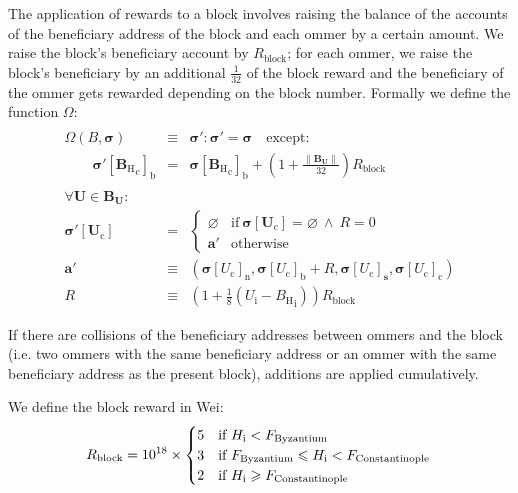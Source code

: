 \documentclass[9pt,oneside]{amsart}
\makeatletter
\newcommand{\linkdest}[1]{\Hy@raisedlink{\hypertarget{#1}{}}}
\makeatother
\begin{document}
\begin{multicols}{2}
The application of rewards to a block involves raising the balance of the accounts of the beneficiary address of the block and each ommer by a certain amount. We raise the block's beneficiary account by \hyperlink{R__block}{$R_{\mathrm{block}}$}; for each ommer, we raise the block's beneficiary by an additional $\frac{1}{32}$ of the block reward and the beneficiary of the ommer gets rewarded depending on the block number.\hypertarget{Omega}{} Formally we define the function $\Omega$:
\begin{eqnarray}
\\ \nonumber
\Omega(B, \boldsymbol{\sigma}) & \equiv & \boldsymbol{\sigma}': \boldsymbol{\sigma}' = \boldsymbol{\sigma} \quad \text{except:} \\
\qquad\boldsymbol{\sigma}'[{\mathbf{B}_{\mathrm{H}}}_{\mathrm{c}}]_{\mathrm{b}} & = & \boldsymbol{\sigma}[{\mathbf{B}_{\mathrm{H}}}_{\mathrm{c}}]_{\mathrm{b}} + \left(1 + \frac{\lVert \mathbf{B}_{\mathbf{U}}\rVert}{32}\right)R_{\mathrm{block}} \\
\\ \nonumber
\forall \mathbf{U} \in \mathbf{B}_{\mathbf{U}}: \\ \nonumber
\boldsymbol{\sigma}'[\mathbf{U}_{\mathrm{c}}] & = & \begin{cases}
\varnothing &\text{if}\ \boldsymbol{\sigma}[\mathbf{U}_{\mathrm{c}}] = \varnothing\ \wedge\ R = 0 \\
\mathbf{a}' &\text{otherwise}
\end{cases} \\
\mathbf{a}' &\equiv& (\boldsymbol{\sigma}[U_{\mathrm{c}}]_{\mathrm{n}}, \boldsymbol{\sigma}[U_{\mathrm{c}}]_{\mathrm{b}} + R, \boldsymbol{\sigma}[U_{\mathrm{c}}]_{\mathbf{s}}, \boldsymbol{\sigma}[U_{\mathrm{c}}]_{\mathrm{c}}) \\
R & \equiv & \left(1 + \frac{1}{8} (U_{\mathrm{i}} - {B_{\mathrm{H}}}_{\mathrm{i}})\right) R_{\mathrm{block}}
\end{eqnarray}

If there are collisions of the beneficiary addresses between ommers and the block (i.e. two ommers with the same beneficiary address or an ommer with the same beneficiary address as the present block), additions are applied cumulatively.

\hypertarget{block_reward_R__block}{}\linkdest{R__block}We define the block reward in Wei:
\begin{equation}
R_{\mathrm{block}} = 10^{18} \times \begin{cases}
5 &\text{if}\ H_{\mathrm{i}} < F_{\mathrm{Byzantium}} \\
3 &\text{if}\ F_{\mathrm{Byzantium}} \leqslant H_{\mathrm{i}} < F_{\mathrm{Constantinople}} \\
2 &\text{if}\ H_{\mathrm{i}} \geqslant F_{\mathrm{Constantinople}} \\
\end{cases} \\
\end{equation}


\end{multicols}
\end{document}
